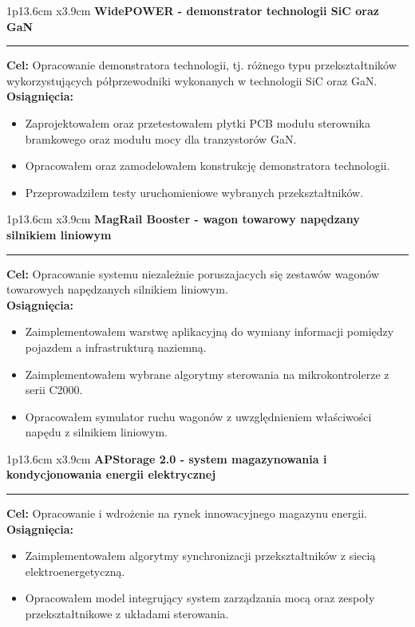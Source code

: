 \documentclass[10pt,A4]{article}
\newcommand{\cveventModified}[1]
{

\begin{tabular*}{1\textwidth}{p{13.6cm}  x{3.9cm}}
	\textbf{#1}
\end{tabular*}

\vspace{-8pt}
\textcolor{black}{\hrule}
	
\vspace{3pt}
}
\begin{document}
\vspace*{6pt}

\cveventModified{WidePOWER - demonstrator technologii SiC oraz GaN}
\textbf{Cel:} Opracowanie demonstratora technologii, tj. różnego typu przekształtników wykorzystujących półprzewodniki wykonanych w technologii SiC oraz GaN.
\\
\textbf{Osiągnięcia:}
\begin{itemize}[label=$\bullet$, nolistsep, leftmargin=*]
	\item Zaprojektowałem oraz przetestowałem płytki PCB modułu sterownika bramkowego oraz modułu mocy dla tranzystorów GaN.
	\item Opracowałem oraz zamodelowałem konstrukcję demonstratora technologii.
	\item Przeprowadziłem testy uruchomieniowe wybranych przekształtników.
\end{itemize}

\vspace*{6pt}

\cveventModified{MagRail Booster - wagon towarowy napędzany silnikiem liniowym}
\textbf{Cel:} Opracowanie systemu niezależnie poruszajacych się zestawów wagonów towarowych napędzanych silnikiem liniowym. \\
\textbf{Osiągnięcia:}
\begin{itemize}[label=$\bullet$, nolistsep, leftmargin=*]
	\item Zaimplementowałem warstwę aplikacyjną do wymiany informacji pomiędzy pojazdem a infrastrukturą naziemną.
	\item Zaimplementowałem wybrane algorytmy sterowania na mikrokontrolerze z serii C2000.
	\item Opracowałem symulator ruchu wagonów z uwzględnieniem właściwości napędu z silnikiem liniowym.
\end{itemize}

\vspace*{6pt}

\cveventModified{APStorage 2.0 - system magazynowania i kondycjonowania energii elektrycznej}
\textbf{Cel:}  Opracowanie i wdrożenie na rynek innowacyjnego magazynu energii. \\
\textbf{Osiągnięcia:}
\begin{itemize}[label=$\bullet$, nolistsep, leftmargin=*]
	\item Zaimplementowałem algorytmy synchronizacji przekształtników z siecią elektroenergetyczną.
	\item Opracowałem model integrujący system zarządzania mocą oraz zespoły przekształtnikowe z układami sterowania.
\end{itemize}
\end{document}
